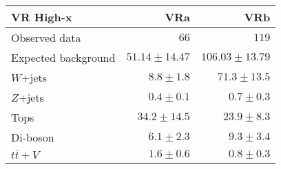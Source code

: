 \begin{table}
  \begin{center}
    \caption{ \label{tab::BGestimation::VRyields_Highx}   }

    \begin{tabular*}{\textwidth}{@{\extracolsep{\fill}}lrr}
      \toprule
      \textbf{VR High-x}  & VRa & VRb  \\
      \midrule

Observed data & $66$ & $119$ \\
\midrule
Expected background & $51.14 \pm 14.47$ & $106.03 \pm 13.79$ \\
\midrule
$W$+jets & $8.8 \pm 1.8$ & $71.3 \pm 13.5$ \\
$Z$+jets & $0.4 \pm 0.1$ & $0.7 \pm 0.3$ \\
Tops & $34.2 \pm 14.5$ & $23.9 \pm 8.3$ \\
Di-boson & $6.1 \pm 2.3$ & $9.3 \pm 3.4$ \\
$t\bar{t}+V$ & $1.6 \pm 0.6$ & $0.8 \pm 0.3$ \\
        \bottomrule
        \end{tabular*}

  \end{center}
\end{table}



